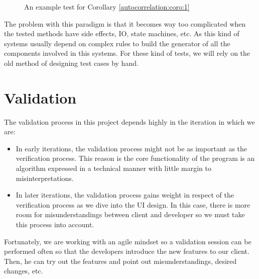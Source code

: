     \begin{figure}[ht!]
      \caption{An example test for Corollary \ref{autocorrelation:coro:1}}
      \label{test_example}
    \end{figure}

    The problem with this paradigm is that it becomes way too complicated when
    the tested methods have side effects, IO, state machines, etc. As this
    kind of systems usually depend on complex rules to build the generator of
    all the components involved in this systems. For these kind of tests, we
    will rely on the old method of designing test cases by hand.\\

\section{Validation}

The validation process in this project depends highly in the iteration in which
we are:

\begin{itemize}
  \item In early iterations, the validation process might not be as important
  as the verification process. This reason is the core functionality of the
  program is an algorithm expressed in a technical manner with little margin
  to misinterpretations.
  \item In later iterations, the validation process gains weight in respect of
  the verification process as we dive into the UI design. In this case, there
  is more room for misunderstandings between client and developer so we must
  take this process into account.
\end{itemize}

Fortunately, we are working with an agile mindset so a validation
session can be performed often so that the developers introduce the new features to
our client. Then, he can try out the features and point out misunderstandings,
desired changes, etc.\\
